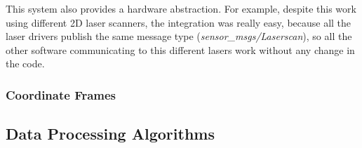 This system also provides a hardware abstraction. For example, despite this work using different 2D laser scanners, the integration was really easy, because all the laser drivers publish the same message type (\textit{sensor\_msgs/Laserscan}), so all the other software communicating to this different lasers work without any change in the code.

\subsubsection{Coordinate Frames}



\subsection{Data Processing Algorithms}
\label{section:software_data_processing}